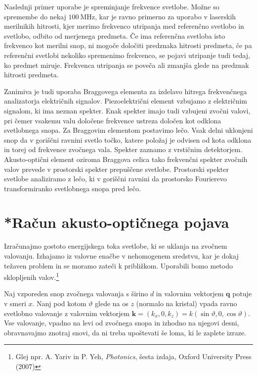 Naslednji primer uporabe je spreminjanje frekvence svetlobe. Možne so spremembe
do nekaj $100~\si{\mega\hertz}$, kar je ravno primerno za uporabo v laserskih merilnikih
hitrosti, kjer merimo frekvenco utripanja med referenčno svetlobo in svetlobo, odbito od
merjenega predmeta. Če ima referenčna svetloba
isto frekvenco kot merilni snop, ni mogoče določiti predznaka hitrosti
predmeta, če pa referenčni svetlobi nekoliko spremenimo frekvenco,
se pojavi utripanje tudi tedaj, ko predmet miruje. Frekvenca utripanja
se poveča ali zmanjša glede na predznak hitrosti predmeta.

Zanimiva je tudi uporaba Braggovega elementa za izdelavo
hitrega frekvenčnega analizatorja električnih signalov.  
Piezoelektrični element vzbujamo z električnim signalom,
ki ima neznan spekter. Enak spekter imajo tudi vzbujeni zvočni valovi, 
pri čemer vsakemu valu določene frekvence ustreza določen kot odklona svetlobnega
snopa. Za Braggovim elementom postavimo lečo. Vsak delni uklonjeni
snop da v goriščni ravnini svetlo točko, katere položaj je odvisen
od kota odklona in torej od frekvence zvočnega vala. Spekter zaznamo
z vrstičnim detektorjem. Akusto-optični element oziroma Braggova celica 
tako frekvenčni spekter zvočnih valov prevede v prostorski
spekter prepuščene svetlobe. Prostorski spekter svetlobe
analiziramo z lečo, ki v goriščni ravnini da prostorsko
Fourierevo transformiranko svetlobnega snopa pred lečo.

\section{*Račun akusto-optičnega pojava}
Izračunajmo gostoto energijskega toka svetlobe, ki se uklanja na zvočnem valovanju. Izhajamo 
iz valovne enačbe v nehomogenem sredstvu, kar je dokaj težaven problem
in se moramo zateči k približkom. Uporabili bomo metodo sklopljenih 
valov.\footnote{Glej npr. A. Yariv in 
P. Yeh, {\it Photonics}, šesta izdaja, Oxford University Press (2007)}

Naj vzporeden snop zvočnega valovanja s širino $d$ in valovnim vektorjem $\mathbf{q}$ 
potuje v smeri $x$.
Nanj pod kotom $\vartheta$ glede na os $z$ (normalo na kristal) 
vpada ravno svetlobno valovanje z valovnim vektorjem 
$\mathbf{k}=(k_{x},0,k_{z})= k(\sin\vartheta,0,\cos\vartheta)$.
Vse valovanje, vpadno na levi od zvočnega snopa in izhodno na njegovi desni,
obravnavajmo znotraj snovi, da ni treba upoštevati še loma, ki
le zaplete izraze. 


